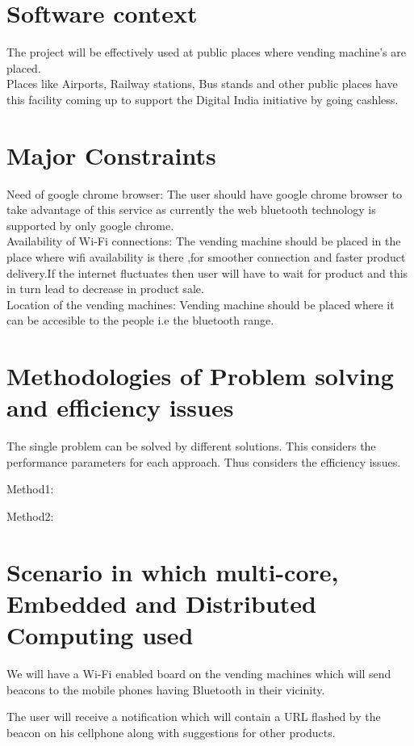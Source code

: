 \documentclass[oneside,a4paper,12pt]{report}
\begin{document}
\section{Software context}
The project will be effectively used at public places where vending machine's are placed.\\
Places like Airports, Railway stations, Bus stands and other public places have this facility coming up to support the Digital India initiative by going cashless.\\

\section{Major Constraints}
Need of google chrome browser: The user should have google chrome browser to take advantage of this service as currently the web bluetooth technology is supported by only google chrome. \\
Availability of Wi-Fi connections: The vending machine should be placed in the place where wifi availability is there ,for smoother connection and faster product delivery.If the internet fluctuates then user will have to wait for product and this in turn lead to decrease in product sale.\\
Location of the vending machines: Vending machine should be placed where it can be accesible to the people i.e the bluetooth range.\\


\section{Methodologies of Problem solving and efficiency issues}
The single problem can be solved by different solutions.  This considers the performance parameters for each approach. Thus considers the efficiency issues.

Method1:


Method2:

\section{Scenario in which multi-core, Embedded and Distributed Computing used}

 We will have a Wi-Fi enabled board on the vending machines which will send beacons to the mobile phones having Bluetooth in their vicinity.
 
 The user will receive a notification which will contain a URL flashed by the beacon on his cellphone along with suggestions for other products.
\end{document}
